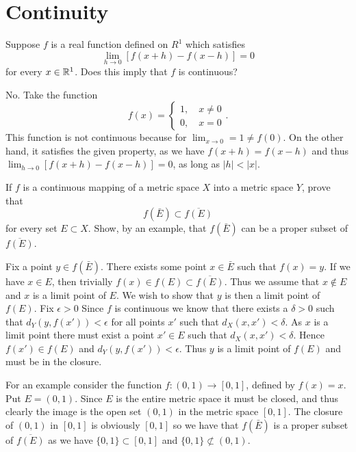 \section{Continuity}

\begin{problem}
  Suppose $f$ is a real function defined on $R^1$ which satisfies
  \[\lim_{h \to 0} [f(x + h) - f(x - h)] = 0\]
  for every $x \in \mathbb{R}^1$.
  Does this imply that $f$ is continuous?
\end{problem}

\begin{solution}
  No. Take the function
  \[f(x) = \begin{cases} 1, \quad x \neq 0\\ 0, \quad x = 0 \end{cases}.\]
  This function is not continuous because for $\lim_{x \to 0} = 1 \neq f(0)$.
  On the other hand, it satisfies the given property, as we have $f(x + h) = f(x - h)$ and thus $\lim_{h \to 0} [f(x + h) - f(x - h)] = 0$, as long as $|h| < |x|$.
\end{solution}

\begin{problem}
  If $f$ is a continuous mapping of a metric space $X$ into a metric space $Y$, prove that
  \[f(\bar{E}) \subset \overline{f(E)}\]
  for every set $E \subset X$.
  Show, by an example, that $f(\bar{E})$ can be a proper subset of $\overline{f(E)}$.
\end{problem}

\begin{solution}
  Fix a point $y \in f(\bar{E})$.
  There exists some point $x \in \bar{E}$ such that $f(x) = y$.
  If we have $x \in E$, then trivially $f(x) \in f(E) \subset \overline{f(E)}$.
  Thus we assume that $x \notin E$ and $x$ is a limit point of $E$.
  We wish to show that $y$ is then a limit point of $f(E)$.
  Fix $\epsilon > 0$
  Since $f$ is continuous we know that there exists a $\delta > 0$ such that $d_Y (y, f(x')) < \epsilon$ for all points $x'$ such that $d_X (x, x') < \delta$.
  As $x$ is a limit point there must exist a point $x' \in E$ such that $d_X (x, x') < \delta$.
  Hence $f(x') \in f(E)$ and $d_Y (y, f(x')) < \epsilon$.
  Thus $y$ is a limit point of $f(E)$ and must be in the closure.

  For an example consider the function $f : (0, 1) \to [0, 1]$, defined by $f(x) = x$.
  Put $E = (0, 1)$.
  Since $E$ is the entire metric space it must be closed, and thus clearly the image is the open set $(0, 1)$ in the metric space $[0, 1]$.
  The closure of $(0, 1)$ in $[0, 1]$ is obviously $[0, 1]$ so we have that $f(\bar{E})$ is a proper subset of $\overline{f(E)}$ as we have $\{0, 1\} \subset [0, 1]$ and $\{0, 1\} \not\subset (0, 1)$.
\end{solution}
